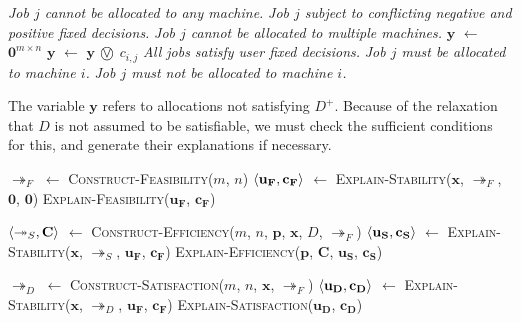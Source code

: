 \begin{algorithm}[H]
	\caption{}
	\begin{algorithmic}[1]
					\State\emph{Job $j$ cannot be allocated to any machine.}
				\EndIf
					\State\emph{Job $j$ subject to conflicting negative and positive fixed decisions.}
				\EndIf
					\State\emph{Job $j$ cannot be allocated to multiple machines.}	
				\EndIf
			\EndFor
			\State $\mathbf{y}$ $\gets$ $\mathbf{0}^{m\times n}$
					\State $\mathbf{y}$ $\gets$ $\mathbf{y}$ $\incircbin{\lor}$ $c_{i,j}$
				\EndFor
			\EndFor
				\State\emph{All jobs satisfy user fixed decisions.}
			\Else
							\State\emph{Job $j$ must be allocated to machine $i$.}
						\EndIf
							\State\emph{Job $j$ must not be allocated to machine $i$.}
						\EndIf			
					\EndFor
				\EndFor
			\EndIf
		\EndFunction
	\end{algorithmic}
\end{algorithm}

The variable $\mathbf{y}$ refers to allocations not satisfying $D^+$. Because of the relaxation that $D$ is not assumed to be satisfiable, we must check the sufficient conditions for this, and generate their explanations if necessary.

\begin{algorithm}[H]
	\caption{}
	\begin{algorithmic}[1]
			\State $\twoheadrightarrow_F$ $\gets$ \textsc{Construct-Feasibility}($m$, $n$)
			\State $\langle{\mathbf{u_F}},{\mathbf{c_F}}\rangle$ $\gets$ \textsc{Explain-Stability}($\mathbf{x}$, $\twoheadrightarrow_F$, $\mathbf{0}$, $\mathbf{0}$)
			\State\textsc{Explain-Feasibility}($\mathbf{u_F}$, $\mathbf{c_F}$)

			\State $\langle{\twoheadrightarrow_S},{\mathbf{C}}\rangle$ $\gets$ \textsc{Construct-Efficiency}($m$, $n$, $\mathbf{p}$, $\mathbf{x}$, $D$, $\twoheadrightarrow_F$)
			\State $\langle{\mathbf{u_S}},{\mathbf{c_S}}\rangle$ $\gets$ \textsc{Explain-Stability}($\mathbf{x}$, $\twoheadrightarrow_S$, $\mathbf{u_F}$, $\mathbf{c_F}$)
			\State\textsc{Explain-Efficiency}($\mathbf{p}$, $\mathbf{C}$, $\mathbf{u_S}$, $\mathbf{c_S}$)

			\State $\twoheadrightarrow_D$ $\gets$ \textsc{Construct-Satisfaction}($m$, $n$, $\mathbf{x}$, $\twoheadrightarrow_F$)
			\State $\langle{\mathbf{u_D}},{\mathbf{c_D}}\rangle$ $\gets$ \textsc{Explain-Stability}($\mathbf{x}$, $\twoheadrightarrow_D$, $\mathbf{u_F}$, $\mathbf{c_F}$)
			\State\textsc{Explain-Satisfaction}($\mathbf{u_D}$, $\mathbf{c_D}$)
		\EndFunction
	\end{algorithmic}
\end{algorithm}


